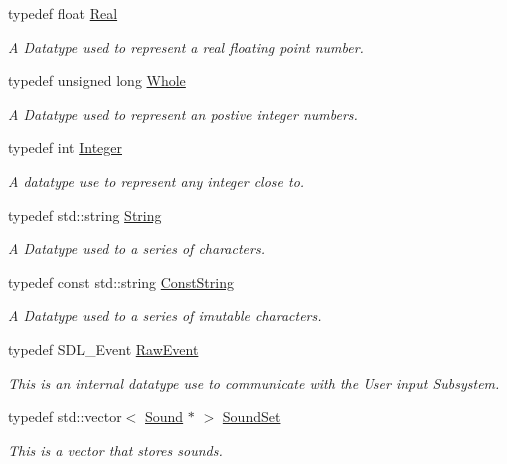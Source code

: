 \begin{DoxyCompactItemize}
\item 
typedef float \hyperlink{namespacephys_af7eb897198d265b8e868f45240230d5f}{Real}
\begin{DoxyCompactList}\small\item\em A Datatype used to represent a real floating point number. \item\end{DoxyCompactList}\item 
typedef unsigned long \hyperlink{namespacephys_a460f6bc24c8dd347b05e0366ae34f34a}{Whole}
\begin{DoxyCompactList}\small\item\em A Datatype used to represent an postive integer numbers. \item\end{DoxyCompactList}\item 
typedef int \hyperlink{namespacephys_a7f09bf5585b2bb97613cd9aad4273a81}{Integer}
\begin{DoxyCompactList}\small\item\em A datatype use to represent any integer close to. \item\end{DoxyCompactList}\item 
typedef std::string \hyperlink{namespacephys_aa03900411993de7fbfec4789bc1d392e}{String}
\begin{DoxyCompactList}\small\item\em A Datatype used to a series of characters. \item\end{DoxyCompactList}\item 
typedef const std::string \hyperlink{namespacephys_a5ce5049f8b4bf88d6413c47b504ebb31}{ConstString}
\begin{DoxyCompactList}\small\item\em A Datatype used to a series of imutable characters. \item\end{DoxyCompactList}\item 
typedef SDL\_\-Event \hyperlink{namespacephys_a8126d26e4507e66d09876988bb941fd4}{RawEvent}
\begin{DoxyCompactList}\small\item\em This is an internal datatype use to communicate with the User input Subsystem. \item\end{DoxyCompactList}\item 
typedef std::vector$<$ \hyperlink{classphys_1_1Sound}{Sound} $\ast$ $>$ \hyperlink{namespacephys_ab780c3162da5699fe421f3739ba03fc4}{SoundSet}
\begin{DoxyCompactList}\small\item\em This is a vector that stores sounds. \item\end{DoxyCompactList}\end{DoxyCompactItemize}
